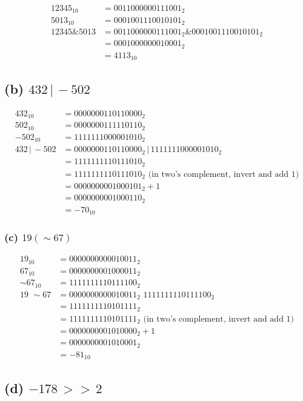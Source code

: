 \documentclass{article}
\begin{document}
\begin{align*}
12345_{10} &= 0011000000111001_2 \\
5013_{10} &= 0001001110010101_2 \\
12345 \& 5013 &= 0011000000111001_2 \& 0001001110010101_2 \\
&= 0001000000010001_2 \\
&= 4113_{10}
\end{align*}

\subsection*{(b) \(432 \, | \, -502\)}

\begin{align*}
432_{10} &= 0000000110110000_2 \\
502_{10} &= 0000000111110110_2 \\
-502_{10} &= 1111111000001010_2 \\
432 \, | \, -502 &= 0000000110110000_2 \, | \, 1111111000001010_2 \\
&= 1111111110111010_2 \\
&= 1111111110111010_2 \text{ (in two's complement, invert and add 1)} \\
&= 0000000001000101_2 + 1 \\
&= 0000000001000110_2 \\
&= -70_{10}
\end{align*}


\subsubsection*{(c) \( 19 \hat{} (\sim 67) \)}


\begin{align*}
19_{10} &= 0000000000010011_2 \\
67_{10} &= 0000000001000011_2 \\
\sim 67_{10} &= 1111111110111100_2 \\
19 \, ^ \, \sim 67 &= 0000000000010011_2 \,  ^ \, 1111111110111100_2 \\
&= 1111111110101111_2 \\
&= 1111111110101111_2 \text{ (in two's complement, invert and add 1)} \\
&= 0000000001010000_2 + 1 \\
&= 0000000001010001_2 \\
&= -81_{10}
\end{align*}

\subsection*{(d) \(-178 \, >> \, 2\)}
\end{document}
